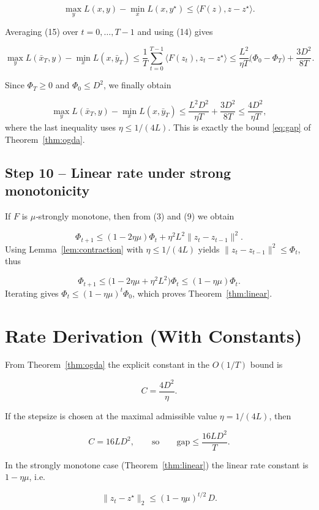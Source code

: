 \documentclass{article}
\begin{document}
\[
\max_{y}L(x,y)-\min_{x}L(x,y^\star)\le \langle F(z),z-z^\star\rangle .
\tag{15}
\]

Averaging (15) over $t=0,\dots,T-1$ and using (14) gives  

\[
\max_{y}L(\bar x_T,y)-\min_{x}L(x,\bar y_T)
\le\frac{1}{T}\sum_{t=0}^{T-1}\langle F(z_t),z_t-z^\star\rangle
\le\frac{L^2}{\eta T}\bigl(\Phi_0-\Phi_T\bigr)+\frac{3D^2}{8T}.
\tag{16}
\]

Since $\Phi_T\ge0$ and $\Phi_0\le D^2$, we finally obtain  

\[
\max_{y}L(\bar x_T,y)-\min_{x}L(x,\bar y_T)
\le\frac{L^2 D^{2}}{\eta T}+\frac{3D^{2}}{8T}
\le\frac{4D^{2}}{\eta T},
\]
where the last inequality uses $\eta\le 1/(4L)$. This is exactly the bound \eqref{eq:gap} of Theorem~\ref{thm:ogda}. \hfill\qedsymbol

\subsection{Step 10 – Linear rate under strong monotonicity}
If $F$ is $\mu$‑strongly monotone, then from (3) and (9) we obtain  

\[
\Phi_{t+1}\le (1-2\eta\mu)\Phi_t+\eta^2L^2\|z_t-z_{t-1}\|^2 .
\]
Using Lemma~\ref{lem:contraction} with $\eta\le 1/(4L)$ yields $\|z_t-z_{t-1}\|^2\le \Phi_t$, thus  

\[
\Phi_{t+1}\le\bigl(1-2\eta\mu+\eta^2L^2\bigr)\Phi_t
\le(1-\eta\mu)\Phi_t .
\]
Iterating gives $\Phi_t\le(1-\eta\mu)^t\Phi_0$, which proves Theorem~\ref{thm:linear}. \hfill\qedsymbol

\section{Rate Derivation (With Constants)}
From Theorem~\ref{thm:ogda} the explicit constant in the $O(1/T)$ bound is  

\[
C=\frac{4D^{2}}{\eta}.
\]

If the stepsize is chosen at the maximal admissible value $\eta=1/(4L)$, then  

\[
C=16L D^{2},
\qquad
\text{so}\qquad
\text{gap}\le\frac{16L D^{2}}{T}.
\]

In the strongly monotone case (Theorem~\ref{thm:linear}) the linear rate constant is $1-\eta\mu$, i.e.  

\[
\|z_t-z^\star\|_2\le (1-\eta\mu)^{t/2}\,D .
\]

\end{document}
